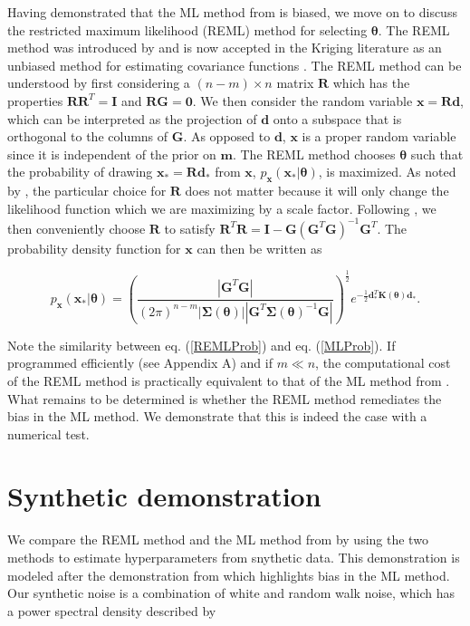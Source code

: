\documentclass[10pt,a4paper]{article}
\begin{document}
Having demonstrated that the ML method from \citet{Langbein1997} is biased, we move on to discuss the restricted maximum likelihood (REML) method for selecting $\mathbf{\theta}$.  The REML method was introduced by \citet{Patterson1971} and is now accepted in the Kriging literature as an unbiased method for estimating covariance functions \citep[e.g.][]{Cressie1992}. The REML method can be understood by first considering a $(n-m)\times n$ matrix $\mathbf{R}$ which has the properties $\mathbf{R}\mathbf{R}^T = \mathbf{I}$ and $\mathbf{R}\mathbf{G}=\mathbf{0}$.  We then consider the random variable $\mathbf{x}=\mathbf{R}\mathbf{d}$, which can be interpreted as the projection of $\mathbf{d}$ onto a subspace that is orthogonal to the columns of $\mathbf{G}$. As opposed to $\mathbf{d}$, $\mathbf{x}$ is a proper random variable since it is independent of the prior on $\mathbf{m}$. The REML method chooses $\mathbf{\theta}$ such that the probability of drawing $\mathbf{x}_*=\mathbf{R}\mathbf{d}_*$ from $\mathbf{x}$, $p_\mathbf{x}(\mathbf{x}_*|\mathbf{\theta})$, is maximized. As noted by \citet{Harville1974}, the particular choice for $\mathbf{R}$ does not matter because it will only change the likelihood function which we are maximizing by a scale factor. Following \citet{Harville1974}, we then conveniently choose $\mathbf{R}$ to satisfy $\mathbf{R}^T\mathbf{R} = \mathbf{I} - \mathbf{G}(\mathbf{G}^T\mathbf{G})^{-1}\mathbf{G}^T$.  The probability density function for $\mathbf{x}$ can then be written as 

\begin{equation}\label{REMLProb}
p_\mathbf{x}(\mathbf{x}_*|\mathbf{\theta}) =
\left(\frac{\left|\mathbf{G}^T\mathbf{G}\right|}
           {(2\pi)^{n-m}
            \left| \mathbf{\Sigma}(\mathbf{\theta}) \right| 
            \left| \mathbf{G}^T\mathbf{\Sigma}(\mathbf{\theta})^{-1}\mathbf{G} \right|}\right)^{\frac{1}{2}} 
e^{-\tfrac{1}{2}\mathbf{d}_*^T\mathbf{K}(\mathbf{\theta})\mathbf{d}_*} .
\end{equation}

Note the similarity between eq. (\ref{REMLProb}) and eq. (\ref{MLProb}). If programmed efficiently (see Appendix A) and if $m \ll n$, the computational cost of the REML method is practically equivalent to that of the ML method from \citet{Langbein1997}. What remains to be determined is whether the REML method remediates the bias in the ML method. We demonstrate that this is indeed the case with a numerical test. 

\section{Synthetic demonstration}
We compare the REML method and the ML method from \citet{Langbein1997} by using the two methods to estimate hyperparameters from snythetic data. This demonstration is modeled after the demonstration from \citet{Langbein2012} which highlights bias in the ML method. Our synthetic noise is a combination of white and random walk noise, which has a power spectral density described by
\end{document}
